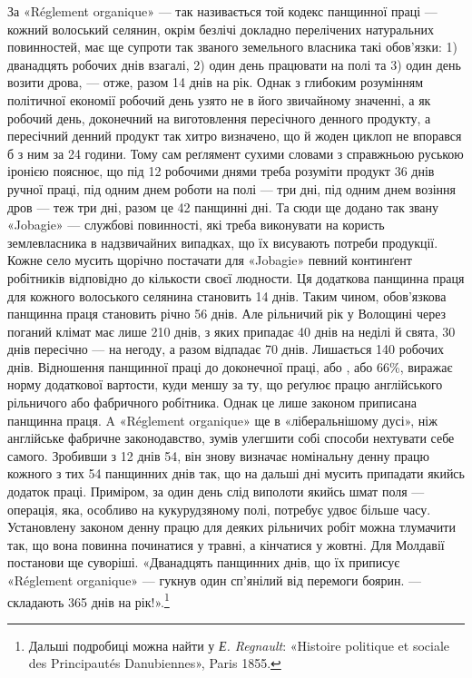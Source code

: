 За «Réglement organique» — так називається той кодекс панщинної
праці — кожний волоський селянин, окрім безлічі докладно
перелічених натуральних повинностей, має ще супроти так
званого земельного власника такі обов’язки: 1) дванадцять робочих
днів взагалі, 2) один день працювати на полі та 3) один день
возити дрова, — отже, разом 14 днів на рік. Однак з глибоким розумінням
політичної економії робочий день узято не в його звичайному
значенні, а як робочий день, доконечний на виготовлення
пересічного денного продукту, а пересічний денний продукт так
хитро визначено, що й жоден циклоп не впорався б з ним за
24 години. Тому сам реґлямент сухими словами з справжньою
руською іронією пояснює, що під 12 робочими днями треба розуміти
продукт 36 днів ручної праці, під одним днем роботи на полі —
три дні, під одним днем возіння дров — теж три дні, разом це
42 панщинні дні. Та сюди ще додано так звану «Jobagie» — службові
повинності, які треба виконувати на користь землевласника
в надзвичайних випадках, що їх висувають потреби продукції.
Кожне село мусить щорічно постачати для «Jobagie» певний
континґент робітників відповідно до кількости своєї людности.
Ця додаткова панщинна праця для кожного волоського селянина
становить 14 днів. Таким чином, обов’язкова панщинна праця
становить річно 56 днів. Але рільничий рік у Волощині через
поганий клімат має лише 210 днів, з яких припадає 40 днів на
неділі й свята, 30 днів пересічно — на негоду, а разом відпадає
70 днів. Лишається 140 робочих днів. Відношення панщинної
праці до доконечної праці, або , або 66\%, виражає норму додаткової
вартости, куди меншу за ту, що реґулює працю англійського
рільничого або фабричного робітника. Однак це лише
законом приписана панщинна праця. A «Réglement organique»
ще в «ліберальнішому дусі», ніж англійське фабричне законодавство,
зумів улегшити собі способи нехтувати себе самого.
Зробивши з 12 днів 54, він знову визначає номінальну денну працю
кожного з тих 54 панщинних днів так, що на дальші дні мусить
припадати якийсь додаток праці. Приміром, за один день слід
виполоти якийсь шмат поля — операція, яка, особливо на кукурудзяному
полі, потребує удвоє більше часу. Установлену законом
денну працю для деяких рільничих робіт можна тлумачити
так, що вона повинна починатися у травні, а кінчатися у жовтні.
Для Молдавії постанови ще суворіші. «Дванадцять панщинних
днів, що їх приписує «Réglement organique» — гукнув один
сп’янілий від перемоги боярин. — складають 365 днів на рік!».\footnote{
Дальші подробиці можна найти у \emph{Е. Regnault}: «Histoire politique
et sociale des Principautés Danubiennes», Paris 1855.
}

